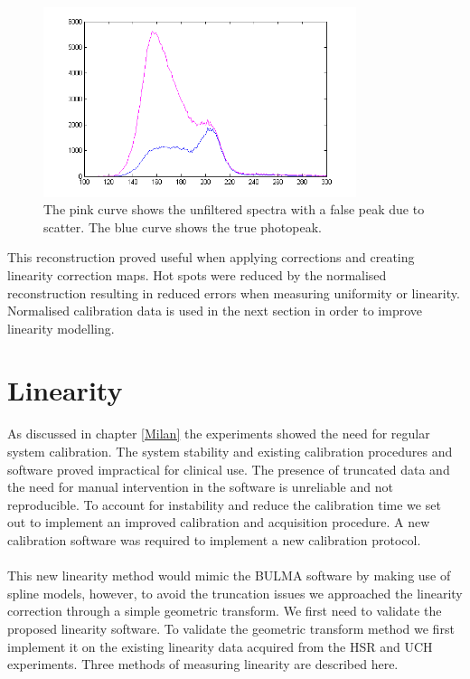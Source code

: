 \begin{figure}[!t]
\centering
\includegraphics[width=3.6in]{figures/new_spectrum.png}

    \caption{The pink curve shows the unfiltered spectra with a false peak due to scatter. The blue curve shows the true photopeak.} \label{fig:MaskEW}
\end{figure}

This reconstruction proved useful when applying corrections and creating linearity correction maps. Hot spots were reduced by the normalised reconstruction resulting in reduced errors when measuring uniformity or linearity. Normalised calibration data is used in the next section in order to improve linearity modelling.

\section{Linearity}
As discussed in chapter \ref{Milan} the experiments showed the need for regular system calibration. The system stability and existing calibration procedures and software proved impractical for clinical use. The presence of truncated data and the need for manual intervention in the software is unreliable and not reproducible. To account for instability and reduce the calibration time we set out to implement an improved calibration and acquisition procedure. A new calibration software was required to implement a new calibration protocol.
\paragraph{}
This new linearity method would mimic the BULMA software by making use of spline models, however, to avoid the truncation issues we approached the linearity correction through a simple geometric transform. We first need to validate the proposed linearity software. To validate the geometric transform method we first implement it on the existing linearity data acquired from the \acrshort{HSR} and \acrshort{UCH} experiments. Three methods of measuring linearity are described here. 

